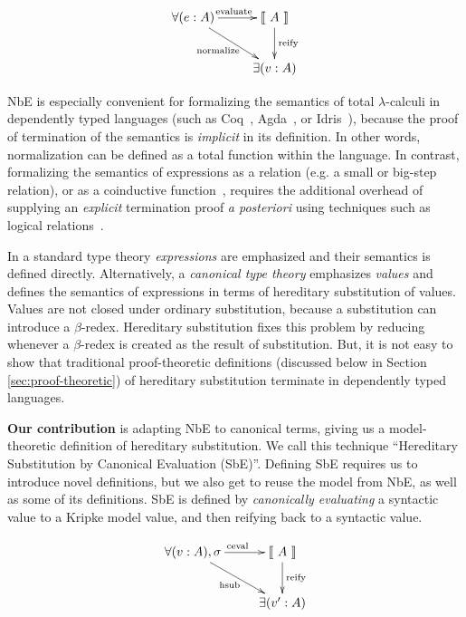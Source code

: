 \documentclass{llncs}
\newcommand{\refsec}[1]{Section \ref{sec:#1}}
\newcommand{\ascribe}[2]{(#1 : #2)}
\newcommand{\el}[1]{\llbracket ~ #1 ~ \rrbracket}
\newcommand{\fun}[1]{\textmd{#1}}
\begin{document}
\begin{displaymath}
    \xymatrix{
          {\forall (e : A)} 
          \ar[dr]_{\fun{normalize}}
          \ar[r]^{\fun{evaluate}}
        & {\el{A}}
          \ar[d]^{\large{\fun{reify}}}
\\      & \exists (v : A) }
\end{displaymath}

NbE is especially convenient for formalizing the semantics of total
$\lambda$-calculi in dependently typed languages (such as
Coq~\cite{TODO}, Agda~\cite{TODO}, or Idris~\cite{TODO}), because the
proof of termination of the semantics is \textit{implicit} in its
definition. In other words, normalization can be defined as a total
function within the language.
In contrast, formalizing the semantics of expressions as a
relation (e.g. a small or big-step relation), or as a
coinductive function~\cite{TODO}, requires the additional overhead
of supplying an \textit{explicit}
termination proof \textit{a posteriori} using techniques such as
logical relations~\cite{TODO}.

In a standard type theory \textit{expressions} are emphasized and
their semantics is defined directly. Alternatively, a
\textit{canonical type theory} emphasizes \textit{values} and defines
the semantics of expressions in terms of hereditary substitution of
values. Values are not closed under ordinary substitution, because a
substitution can introduce a $\beta$-redex. Hereditary substitution
fixes this problem by reducing whenever a $\beta$-redex is created as
the result of substitution. But, it is not easy to show that
traditional proof-theoretic definitions (discussed below in
\refsec{proof-theoretic}) of hereditary substitution terminate in
dependently typed languages.

\textbf{Our contribution} is adapting NbE to canonical terms, giving us a model-theoretic
definition of hereditary substitution. We call this technique
``Hereditary Substitution by Canonical Evaluation (SbE)''. Defining
SbE requires us to introduce novel definitions, but we also get to
reuse the model from NbE, as well as some of its definitions. SbE is
defined by \textit{canonically evaluating} a syntactic value to a
Kripke model value, and then reifying back to a syntactic value.

\begin{displaymath}
    \xymatrix{
          \forall{\ascribe{v}{A}, \sigma}
          \ar[dr]_{\fun{hsub}}
          \ar[r]^{\fun{ceval}}
        & {\el{A}}
          \ar[d]^{\large{\fun{reify}}}
\\      & \exists{\ascribe{v'}{A}} }
\end{displaymath}
\end{document}
